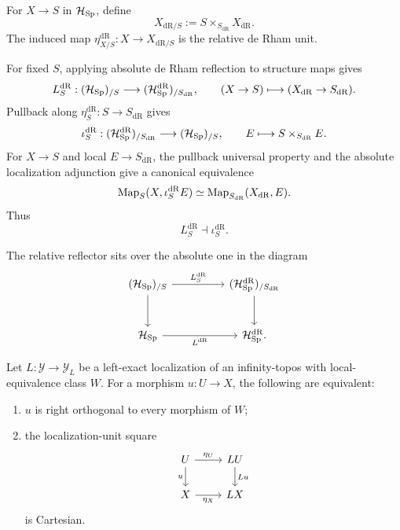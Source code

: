 \begin{definition}
For \(X\to S\) in \(\mathcal H_{\operatorname{Sp}}\), define
\[
  X_{\mathrm{dR}/S}
  :=
  S\times_{S_{\mathrm{dR}}}X_{\mathrm{dR}}.
\]
The induced map \(\eta_{X/S}^{\mathrm{dR}}:X\to X_{\mathrm{dR}/S}\) is the relative de Rham
unit.
\end{definition}

\begin{construction}
\label{con:de-Rham-slice-adjunction}
For fixed \(S\), applying absolute de Rham reflection to structure maps gives
\[
  L^{\mathrm{dR}}_S:
  (\mathcal H_{\operatorname{Sp}})_{/S}
  \longrightarrow
  (\mathcal H_{\operatorname{Sp}}^{\mathrm{dR}})_{/S_{\mathrm{dR}}},
  \qquad
  (X\to S)\longmapsto(X_{\mathrm{dR}}\to S_{\mathrm{dR}}).
\]
Pullback along \(\eta_S^{\mathrm{dR}}:S\to S_{\mathrm{dR}}\) gives
\[
  \iota^{\mathrm{dR}}_S:
  (\mathcal H_{\operatorname{Sp}}^{\mathrm{dR}})_{/S_{\mathrm{dR}}}
  \longrightarrow
  (\mathcal H_{\operatorname{Sp}})_{/S},
  \qquad
  E\longmapsto S\times_{S_{\mathrm{dR}}}E.
\]
For \(X\to S\) and local \(E\to S_{\mathrm{dR}}\), the pullback universal
property and the absolute localization adjunction give a canonical equivalence
\[
  \operatorname{Map}_S(X,\iota^{\mathrm{dR}}_SE)
  \simeq
  \operatorname{Map}_{S_{\mathrm{dR}}}(X_{\mathrm{dR}},E).
\]
Thus
\[
  L^{\mathrm{dR}}_S\dashv\iota^{\mathrm{dR}}_S.
\]

The relative reflector sits over the absolute one in the diagram
\[
\begin{tikzcd}[column sep=huge,row sep=large]
  (\mathcal H_{\Sp})_{/S}
    \arrow[r,"L^{\mathrm{dR}}_S"]
    \arrow[d]
  &
  (\mathcal H_{\Sp}^{\mathrm{dR}})_{/S_{\mathrm{dR}}}
    \arrow[d]
  \\
  \mathcal H_{\Sp}
    \arrow[r,"L^{\mathrm{dR}}"']
  &
  \mathcal H_{\Sp}^{\mathrm{dR}}.
\end{tikzcd}
\]

\end{construction}

\begin{lemma}
\label{lem:local-map-orthogonality}
Let \(L:\mathcal Y\to\mathcal Y_L\) be a left-exact localization of an
infinity-topos with local-equivalence class \(W\). For a morphism \(u:U\to X\),
the following are equivalent:
\begin{enumerate}
\item \(u\) is right orthogonal to every morphism of \(W\);
\item the localization-unit square
\[
\begin{tikzcd}
U \ar[r,"\eta_U"] \ar[d,"u"'] & LU \ar[d,"Lu"]\\
X \ar[r,"\eta_X"'] & LX
\end{tikzcd}
\]
is Cartesian.
\end{enumerate}
\end{lemma}

